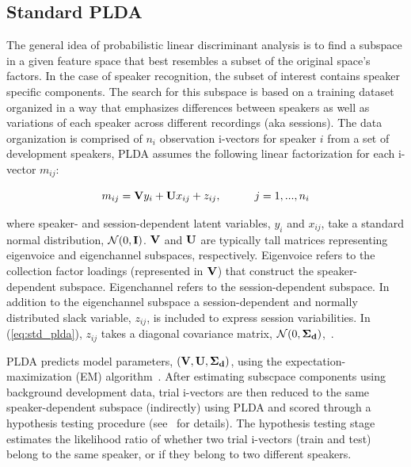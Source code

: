 \documentclass[journal]{IEEEtran}
\begin{document}
\subsection{Standard PLDA}
\label{ssec:standard_plda}
The general idea of probabilistic linear discriminant analysis is to find a subspace in a given feature space that best resembles a subset of the original space's factors. 
In the case of speaker recognition, the subset of interest contains speaker specific components. 
The search for this subspace is based on a training dataset organized in a way that emphasizes differences between speakers as well as variations of each speaker across different recordings (aka sessions). 
The data organization is comprised of $n_i$ observation i-vectors for speaker $i$ from a set of development speakers, PLDA assumes the following linear factorization for each i-vector $m_{ij}$: 

\begin{equation}
\label{eq:std_plda}
m_{ij} = {\bf V}y_i+{\bf U}x_{ij}+z_{ij},  \hspace{30pt} j=1,...,n_i
\end{equation}

where speaker- and session-dependent latent variables, $y_i$ and $x_{ij}$, take a standard normal distribution, $\mathcal{N}(0,{\bf I})$. ${\bf V}$ and ${\bf U}$ are typically tall matrices representing eigenvoice and eigenchannel subspaces, respectively. Eigenvoice refers to the collection factor loadings (represented in ${\bf V}$) that construct the speaker-dependent subspace. Eigenchannel refers to the session-dependent subspace. 
In addition to the eigenchannel subspace a session-dependent and normally distributed slack variable, $z_{ij}$, is included to express session variabilities. In (\ref{eq:std_plda}), $z_{ij}$ takes a diagonal covariance matrix, $\mathcal{N}(0,{\bf \Sigma_d})$,~\cite{kenny_plda,prince_plda}. 

PLDA predicts model parameters, $({\bf V},{\bf U},{\bf \Sigma_d})$, using the expectation-maximization (EM) algorithm~\cite{prince_plda}. 
After estimating subscpace components using background development data, trial i-vectors are then reduced to the same speaker-dependent subspace (indirectly) using PLDA and scored through a hypothesis testing procedure (see~\cite{prince_plda} for details). 
The hypothesis testing stage estimates the likelihood ratio of whether two trial i-vectors (train and test) belong to the same speaker, or if they belong to two different speakers. 
\end{document}
